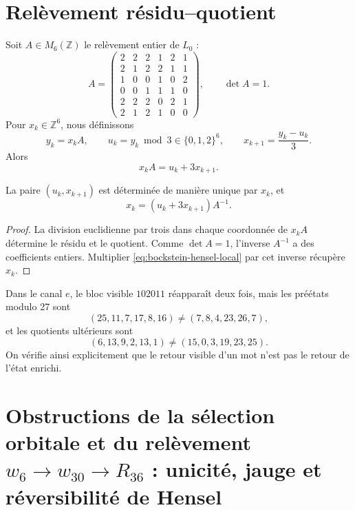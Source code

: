 \section{Relèvement résidu--quotient}

Soit \(A\in M_6(\mathbb Z)\) le relèvement entier de \(L_0\) :
\[
 A=
\begin{pmatrix}
2&2&2&1&2&1\\
2&1&2&2&1&1\\
1&0&0&1&0&2\\
0&0&1&1&1&0\\
2&2&2&0&2&1\\
2&1&2&1&0&0
\end{pmatrix},
\qquad \det A=1.
\]
Pour \(x_k\in\mathbb Z^6\), nous définissons
\[
 y_k=x_kA,
 \qquad
 u_k=y_k\bmod3\in\{0,1,2\}^6,
 \qquad
 x_{k+1}=\frac{y_k-u_k}{3}.
\]
Alors
\begin{equation}
 x_kA=u_k+3x_{k+1}.
\label{eq:bockstein-hensel-local}
\end{equation}

\begin{theorem}
\label{thm:reversibilidad-bockstein-hensel}
La paire \((u_k,x_{k+1})\) est déterminée de manière unique par \(x_k\), et
\[
 x_k=(u_k+3x_{k+1})A^{-1}.
\]
\end{theorem}

\begin{proof}
La division euclidienne par trois dans chaque coordonnée de \(x_kA\) détermine
le résidu et le quotient. Comme \(\det A=1\), l'inverse \(A^{-1}\) a des
coefficients entiers. Multiplier \cref{eq:bockstein-hensel-local} par cet inverse
récupère \(x_k\).
\end{proof}

Dans le canal \(e\), le bloc visible \(102011\) réapparaît deux fois, mais
les préétats modulo 27 sont
\[
 (25,11,7,17,8,16)
 \neq
 (7,8,4,23,26,7),
\]
et les quotients ultérieurs sont
\[
 (6,13,9,2,13,1)
 \neq
 (15,0,3,19,23,25).
\]
On vérifie ainsi explicitement que le retour visible d'un mot n'est pas
le retour de l'état enrichi.

\section{Obstructions de la sélection orbitale et du relèvement \(w_6\to w_{30}\to R_{36}\) : unicité, jauge et réversibilité de Hensel}


